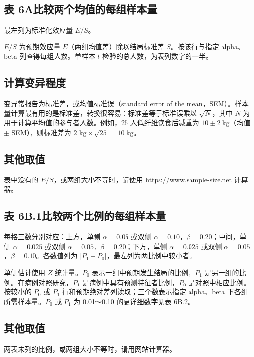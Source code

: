 \clearpage
{}
\subsection*{表 6A\quad 比较两个均值的每组样本量}
最左列为标准化效应量 $E/S$。

\noindent\small $E/S$ 为预期效应量 $E$（两组均值差）除以结局标准差 $S$。按该行与指定 alpha、beta 列查得每组人数。单样本 $t$ 检验的总人数，为表列数字的一半。\par\normalsize
\subsection{计算变异程度}
变异常报告为标准差，或均值标准误（standard error of the mean，SEM）。样本量计算最有用的是标准差，转换很容易：标准差等于标准误乘以 $\sqrt N$，其中 $N$ 为用于计算平均值的参与者人数。例如，25 人低纤维饮食后减重为 $10\pm2$ kg（均值 $\pm$ SEM），则标准差为 $2\text{ kg}\times\sqrt{25}=10\text{ kg}$。
\subsection{其他取值}
表中没有的 $E/S$，或两组大小不等时，请使用 \url{https://www.sample-size.net} 计算器。

\clearpage
{}
\subsection*{表 6B.1\quad 比较两个比例的每组样本量}
每格三数分别对应：上方，单侧 $\alpha=0.05$ 或双侧 $\alpha=0.10$，$\beta=0.20$；中间，单侧 $\alpha=0.025$ 或双侧 $\alpha=0.05$，$\beta=0.20$；下方，单侧 $\alpha=0.025$ 或双侧 $\alpha=0.05$，$\beta=0.10$。各数值列为 $|P_1-P_0|$，最左列为两比例中较小者。

单侧估计使用 $Z$ 统计量。$P_0$ 表示一组中预期发生结局的比例，$P_1$ 是另一组的比例。在病例对照研究，$P_1$ 是病例中具有预测特征者比例，$P_0$ 是对照中相应比例。按较小的 $P_0$ 或 $P_1$ 行和预期绝对差列读取；三个数表示指定 alpha、beta 下各组所需样本量。$P_0$ 或 $P_1$ 为 0.01～0.10 的更详细数字见表 6B.2。
\subsection{其他取值}
两表未列的比例，或两组大小不等时，请用网站计算器。
